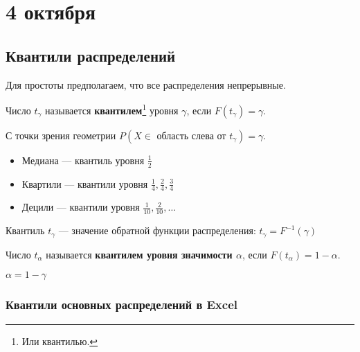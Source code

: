 \chapter{4 октября}

\section{Квантили распределений}

Для простоты предполагаем, что все распределения непрерывные.

\begin{definition}[1]
    Число \(t_\gamma\) называется \textbf{квантилем}\footnote{Или квантилью.} уровня \(\gamma\), если \(F(t_\gamma) = \gamma\).
\end{definition}

С точки зрения геометрии \(P(X \in \text{ область слева от } t_\gamma) = \gamma\).

\begin{remark}\itemfix
    \begin{itemize}
        \item Медиана --- квантиль уровня \(\frac{1}{2}\)
        \item Квартили --- квантили уровня \(\frac{1}{4}, \frac{2}{4}, \frac{3}{4}\)
        \item Децили --- квантили уровня \(\frac{1}{10}, \frac{2}{10}, \dots \)
    \end{itemize}
\end{remark}

\begin{remark}
    Квантиль \(t_\gamma\) --- значение обратной функции распределения: \(t_\gamma = F^{-1}(\gamma)\)
\end{remark}

\begin{definition}[2 (альтернативное)]
    Число \(t_\alpha\) называется \textbf{квантилем уровня значимости \(\alpha\)}, если \(F(t_\alpha) = 1 - \alpha\).
\end{definition}
\begin{remark}
    \(\alpha = 1 - \gamma\)
\end{remark}

\subsection{Квантили основных распределений в Excel}


